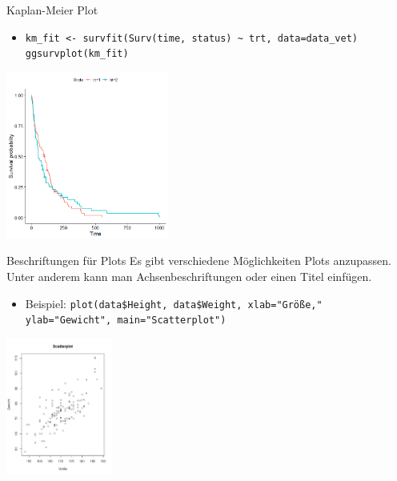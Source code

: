 \documentclass[xcolor=dvipsnames, aspectratio = 169]{beamer}
\begin{document}
\begin{frame}[fragile]{Kaplan-Meier Plot}
	\begin{itemize}
		\item \verb+km_fit <- survfit(Surv(time, status) ~ trt, data=data_vet)+ \\ \verb+ggsurvplot(km_fit)+
	\end{itemize}
			
	\begin{center}
		\includegraphics[height=5.5cm]{KM3}
	\end{center}
\end{frame}

\begin{frame}[fragile]{Beschriftungen für Plots}
	Es gibt verschiedene Möglichkeiten Plots anzupassen. Unter anderem kann man Achsenbeschriftungen oder einen Titel einfügen.
	\begin{itemize}
		\item Beispiel: \verb+plot(data$Height, data$Weight, xlab="Größe,"+
		\verb+            ylab="Gewicht", main="Scatterplot")+
	\end{itemize}
			
	\begin{center}
		\includegraphics[height=4.5cm]{AnnotatedPlot}
	\end{center}
\end{frame}
\end{document}

